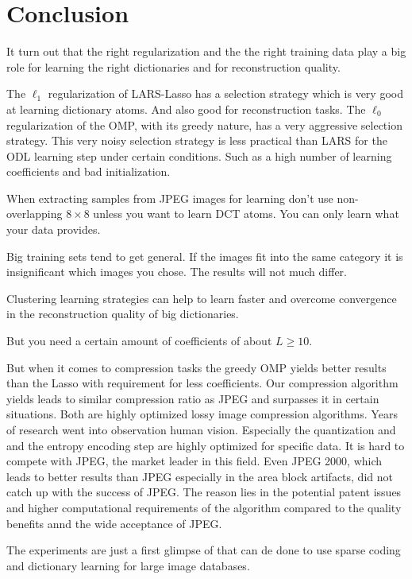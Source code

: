 \chapter{Conclusion}
It turn out that the right regularization and the the right training data
play  a big role for learning the right dictionaries and for reconstruction
quality. 

The $\ell_1$ regularization of LARS-Lasso has a selection strategy
which is very good at learning dictionary atoms. And also good for
reconstruction tasks.  The $\ell_0$ regularization of the OMP, with its greedy
nature, has a very aggressive selection strategy.  This very noisy selection
strategy is less practical than LARS for the ODL learning step under certain
conditions. Such as a high number of learning coefficients and bad
initialization.



When extracting samples from JPEG images for
learning don't use non-overlapping $8 \times 8$ unless you want to learn DCT
atoms. You can only learn what your data provides.

Big training sets tend to get general. If the images fit into the same category
it is insignificant which images you chose. The results will not much differ.

Clustering learning strategies can help to learn faster and overcome
convergence in the reconstruction quality of big dictionaries.


But you need a certain amount of coefficients of about $L \ge 10$.

But when it comes to compression tasks the greedy OMP yields better results
than the Lasso with requirement for less coefficients. 
Our compression algorithm yields leads to similar compression ratio as JPEG
and surpasses it in certain situations. Both are highly optimized lossy image
compression algorithms.  Years of research went into observation human vision. 
Especially the quantization and and the entropy encoding step are highly
optimized for specific data. It is hard to compete with JPEG, the market leader
in this field.  Even JPEG 2000, which leads to better results than JPEG
especially in the area block artifacts, did not catch up with the success of
JPEG.  The reason lies in the potential patent issues and higher computational
requirements of the algorithm compared to the quality benefits annd the wide
acceptance of JPEG.


The experiments are just a first glimpse of that can de done to use sparse
coding and dictionary learning for large image databases.


